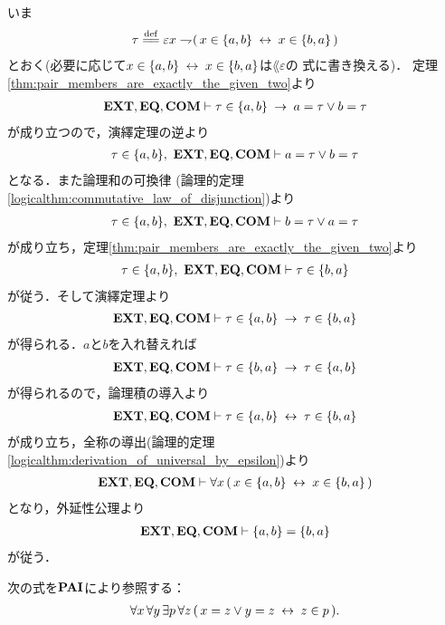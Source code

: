 	\begin{sketch}
		いま
		\begin{align}
			\tau \defeq \varepsilon x \negation (\, x \in \{a,b\} \lrarrow x \in \{b,a\}\, )
		\end{align}
		とおく(必要に応じて$x \in \{a,b\} \hspace{0.25em}\leftrightarrow\hspace{0.25em} x \in \{b,a\}$は$\lang{\varepsilon}$の
		式に書き換える)．
		定理\ref{thm:pair_members_are_exactly_the_given_two}より
		\begin{align}
			\mbox{{\bf EXT}},\mbox{{\bf EQ}},\mbox{\bf COM} \vdash
			\tau \in \{a,b\} \hspace{0.25em}\rightarrow\hspace{0.25em} a = \tau \vee b = \tau
		\end{align}
		が成り立つので，演繹定理の逆より
		\begin{align}
			\tau \in \{a,b\},\ \mbox{{\bf EXT}},\mbox{{\bf EQ}},\mbox{\bf COM} \vdash a = \tau \vee b = \tau
		\end{align}
		となる．また論理和の可換律
		(論理的定理\ref{logicalthm:commutative_law_of_disjunction})より
		\begin{align}
			\tau \in \{a,b\},\ \mbox{{\bf EXT}},\mbox{{\bf EQ}},\mbox{\bf COM} \vdash b = \tau \vee a = \tau
		\end{align}
		が成り立ち，定理\ref{thm:pair_members_are_exactly_the_given_two}より
		\begin{align}
			\tau \in \{a,b\},\ \mbox{{\bf EXT}},\mbox{{\bf EQ}},\mbox{\bf COM} \vdash \tau \in \{b,a\}
		\end{align}
		が従う．そして演繹定理より
		\begin{align}
			\mbox{{\bf EXT}},\mbox{{\bf EQ}},\mbox{\bf COM} \vdash \tau \in \{a,b\} \hspace{0.25em}\rightarrow\hspace{0.25em} \tau \in \{b,a\}
		\end{align}
		が得られる．$a$と$b$を入れ替えれば
		\begin{align}
			\mbox{{\bf EXT}},\mbox{{\bf EQ}},\mbox{\bf COM} \vdash \tau \in \{b,a\} \hspace{0.25em}\rightarrow\hspace{0.25em} \tau \in \{a,b\}
		\end{align}
		が得られるので，論理積の導入より
		\begin{align}
			\mbox{{\bf EXT}},\mbox{{\bf EQ}},\mbox{\bf COM} \vdash \tau \in \{a,b\} \hspace{0.25em}\leftrightarrow\hspace{0.25em} \tau \in \{b,a\}
		\end{align}
		が成り立ち，全称の導出(論理的定理\ref{logicalthm:derivation_of_universal_by_epsilon})より
		\begin{align}
			\mbox{{\bf EXT}},\mbox{{\bf EQ}},\mbox{\bf COM} \vdash \forall x\, (\, x \in \{a,b\} \hspace{0.25em}\leftrightarrow\hspace{0.25em} x \in \{b,a\}\, )
		\end{align}
		となり，外延性公理より
		\begin{align}
			\mbox{{\bf EXT}},\mbox{{\bf EQ}},\mbox{\bf COM} \vdash \{a,b\} = \{b,a\}
		\end{align}
		が従う．
		\QED
	\end{sketch}
		
	\begin{screen}
		\begin{axm}[対の公理] 次の式を$\mbox{{\bf PAI}}$により参照する：
			\begin{align}
				\forall x\, \forall y\, \exists p\, \forall z\, 
				(\, x = z \vee y = z \hspace{0.25em}\leftrightarrow\hspace{0.25em} z \in p\, ).
			\end{align}
		\end{axm}
	\end{screen}
	
